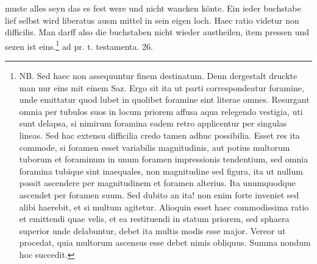                      muste  alles seyn das es fest were und nicht wancken  k\"{o}nte. Ein ieder buchstabe lief selbst wird  liberatus ausm mittel in sein eigen loch.  Haec ratio videtur non difficilis. Man darff also die buchstaben nicht wieder austheilen,  item pressen und sezen ist eins.\footnote{NB. Sed haec non assequuntur  finem destinatum. Denn dergestalt  druckte man nur eins mit einem  Saz. Ergo sit ita ut  parti correspondeatur  foramine, unde emittatur quod lubet  in quolibet foramine sint literae omnes.  Resurgant omnia per tubulos suos  in locum priorem affusa aqua  relegendo vestigia, uti sunt delapsa, si nimirum foramina eadem  retro applicentur per singulas lineas.  Sed hac extensu difficilia credo  tamen adhuc possibilia. Esset res  ita commode, si foramen esset variabilis magnitudinis, aut potius multorum  tuborum et foraminum in unum foramen  impressionis tendentium, sed omnia foramina tubique sint inaequales, non magnitudine sed figura, ita ut nullum  possit ascendere per magnitudinem et foramen alterius. Ita unumquodque  ascendet per foramen suum. Sed  dubito an ita! non enim forte  inveniet sed alibi haerebit, et si multum  agitetur. Alioquin esset haec commodissima ratio et emittendi quae  velis, et ea restituendi in statum  priorem, sed sphaera superior unde  delabuntur, debet ita multis modis  esse major. Vereor ut procedat,  quia multorum ascensus esse debet nimis  obliquus. Summa nondum hoc  succedit.} ad pr. t. testamenta. 26.  \pend 